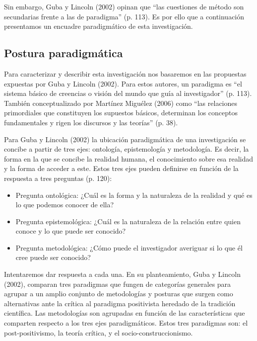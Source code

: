 Sin embargo, Guba y Lincoln (2002) opinan que “las cuestiones de método son
secundarias frente a las de paradigma” (p. 113).
Es por ello que a continuación presentamos un encuadre paradigmático de esta
investigación.

\subsection{Postura paradigmática}
Para caracterizar y describir esta investigación nos basaremos en las propuestas
expuestas por Guba y Lincoln (2002).
Para estos autores, un paradigma es “el sistema básico de creencias o visión del
mundo que guía al investigador” (p. 113).
También conceptualizado por Martínez Miguélez (2006) como “las relaciones
primordiales que constituyen los supuestos básicos, determinan los conceptos
fundamentales y rigen los discursos y las teorías” (p. 38).

Para Guba y Lincoln (2002) la ubicación paradigmática de una investigación se
concibe a partir de tres ejes: ontología, epistemología y metodología.
Es decir, la forma en la que se concibe la realidad humana, el conocimiento
sobre esa realidad y la forma de acceder a este.
Estos tres ejes pueden definirse en función de la respuesta a tres preguntas (p.
120):

\begin{itemize}
    \item Pregunta ontológica: ¿Cuál es la forma y la naturaleza de la realidad
    y qué es lo que podemos conocer de ella?
    \item Pregunta epistemológica: ¿Cuál es la naturaleza de la relación entre
    quien conoce y lo que puede ser conocido?
    \item Pregunta metodológica: ¿Cómo puede el investigador averiguar si lo que
    él cree puede ser conocido?
\end{itemize}

Intentaremos dar respuesta a cada una.
En su planteamiento, Guba y Lincoln (2002), comparan tres paradigmas que fungen
de categorías generales para agrupar a un amplio conjunto de metodologías y
posturas que surgen como alternativas ante la crítica al paradigma positivista
heredado de la tradición científica.
Las metodologías son agrupadas en función de las características que comparten
respecto a los tres ejes paradigmáticos.
Estos tres paradigmas son: el post-positivismo, la teoría crítica, y el
socio-construccionismo.

